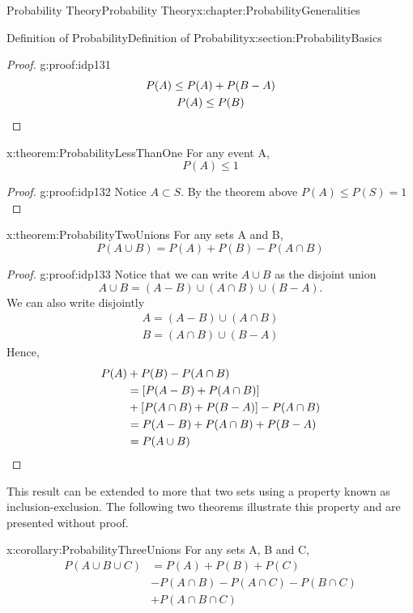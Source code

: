 \documentclass[oneside,10pt,]{book}
\newcommand{\qedhere}{\relax}
\numberwithin{equation}{section}
\begin{document}
\begin{chapterptx}{Probability Theory}{}{Probability Theory}{}{}{x:chapter:ProbabilityGeneralities}
\begin{sectionptx}{Definition of Probability}{}{Definition of Probability}{}{}{x:section:ProbabilityBasics}
\begin{proof}{}{g:proof:idp131}
\begin{gather*}
P(A) \le P(A) + P(B-A) \\
P(A) \le P(B)\qedhere
\end{gather*}
%
\end{proof}
\begin{theorem}{}{}{x:theorem:ProbabilityLessThanOne}%
For any event A,%
\begin{equation*}
P(A) \le 1
\end{equation*}
\end{theorem}
\begin{proof}{}{g:proof:idp132}
Notice \(A \subset S\). By the theorem above \(P(A) \le P(S) = 1\)%
\end{proof}
\begin{theorem}{}{}{x:theorem:ProbabilityTwoUnions}%
For any sets A and B,%
\begin{equation*}
P(A \cup B) = P(A) + P(B) - P(A \cap B)
\end{equation*}
\end{theorem}
\begin{proof}{}{g:proof:idp133}
Notice that we can write \(A \cup B\) as the disjoint union%
\begin{equation*}
A \cup B = (A-B) \cup (A \cap B) \cup (B-A).
\end{equation*}
We can also write disjointly%
\begin{gather*}
A = (A-B) \cup (A \cap B)\\
B = (A \cap B) \cup (B-A)
\end{gather*}
Hence,%
\begin{align*}
P(A) & + P(B) - P(A \cap B) \\
& = [P(A-B) + P(A \cap B)] \\
& + [P(A \cap B) + P(B-A)] - P(A \cap B)\\
& = P(A-B) + P(A \cap B) + P(B-A)\\
& = P(A \cup B)\qedhere
\end{align*}
%
\end{proof}
This result can be extended to more that two sets using a property known as inclusion-exclusion. The following two theorems illustrate this property and are presented without proof.%
\begin{corollary}{}{}{x:corollary:ProbabilityThreeUnions}%
For any sets A, B and C,%
\begin{align*}
P(A \cup B \cup C) & = P(A) + P(B) + P(C)\\
& - P(A \cap B) - P(A \cap C) - P(B \cap C) \\
& + P(A \cap B \cap C)
\end{align*}

\end{corollary}
\end{sectionptx}
\end{chapterptx}
\end{document}
